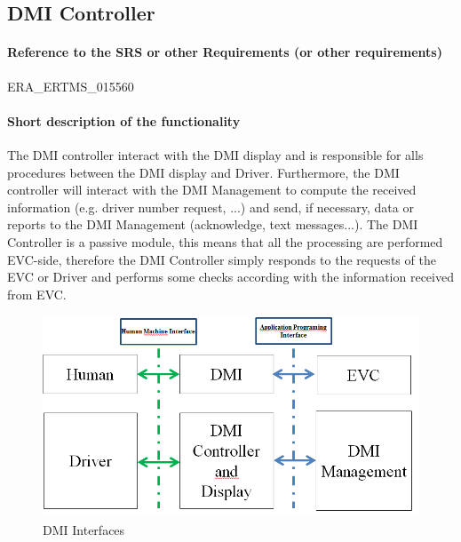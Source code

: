   \subsection{DMI Controller}

  \paragraph{Reference to the SRS or other Requirements (or other requirements)}

   ERA\_ERTMS\_015560

  \paragraph{Short description of the functionality}
  The DMI controller interact with the DMI display and is responsible for alls procedures between the DMI display and Driver. Furthermore, the DMI controller will interact with the DMI Management to compute the received information (e.g. driver number request, ...) and send, if necessary, data or reports to the DMI Management (acknowledge, text messages...). The DMI Controller is a passive module, this means that all the processing are performed EVC-side, therefore the DMI Controller simply responds to the requests of the EVC or Driver and performs some checks according with the information received from EVC.

  \begin{figure}
  \centering
  \includegraphics[width=.8\textwidth]{images/DMI_Interfaces}
  \caption{DMI Interfaces}
  \end{figure}

